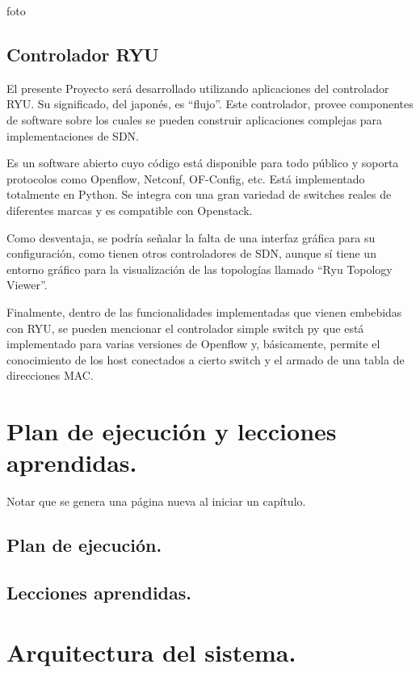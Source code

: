 \documentclass[12pt,a4paper,oneside]{book}
\begin{document}
foto



\section{Controlador RYU}
\label{marco_ryu}

El presente Proyecto será desarrollado utilizando aplicaciones del controlador RYU. Su significado, del japonés, es “flujo”. Este controlador, provee componentes de software sobre los cuales se pueden construir aplicaciones complejas para implementaciones de SDN. 

Es un software abierto cuyo código está disponible para todo público y soporta protocolos como Openflow, Netconf, OF-Config, etc. Está implementado totalmente en Python. Se integra con una gran variedad de switches reales de diferentes marcas y es compatible con Openstack.

Como desventaja, se podría señalar la falta de una interfaz gráfica para su configuración, como tienen otros controladores de SDN, aunque sí tiene un entorno gráfico para la visualización de las topologías llamado “Ryu Topology Viewer”.

Finalmente, dentro de las funcionalidades implementadas que vienen embebidas con RYU, se pueden mencionar el controlador simple switch py que está implementado para varias versiones de Openflow y, básicamente, permite el conocimiento de los host conectados a cierto switch y el armado de una tabla de direcciones MAC.

\chapter{Plan de ejecución y lecciones aprendidas.}
\label{plan_aprendizaje_ejecucion}

Notar que se genera una página nueva al iniciar un capítulo.

\section{Plan de ejecución.}

\section{Lecciones aprendidas.}

\chapter{Arquitectura del sistema.}
\end{document}
